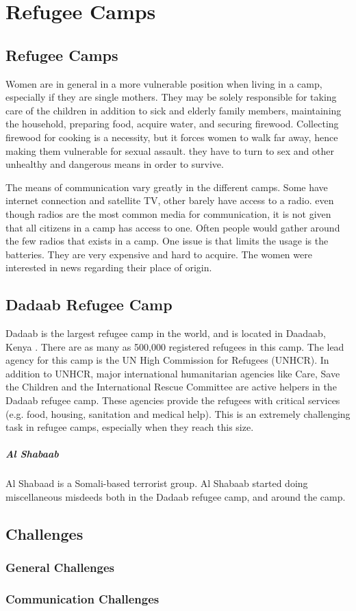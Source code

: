 \chapter{Refugee Camps}
\label{chp:refugeecamps} 

\section{Refugee Camps}

Women are in general in a more vulnerable position when living in a  camp, especially if they are single mothers. They may be solely responsible for taking care of the children in addition to sick and elderly family members, maintaining the household, preparing food, acquire water, and securing firewood. Collecting firewood for cooking is a necessity, but it forces women  to walk far away, hence making them vulnerable for sexual assault. they have to turn to sex and other unhealthy and dangerous means in order to survive. \cite{womenRefugee} 


The means of communication vary greatly in the different camps. Some have internet connection and satellite TV, other barely have access to a radio. even though radios are the most common media for communication, it is not given that all citizens in a camp has access to one. Often people would gather around the few radios that exists in a camp. One issue is that limits the usage is the batteries. They are very expensive and hard to acquire. The women were interested in news regarding their place of origin.   \cite{womenRefugee}  



\section{Dadaab Refugee Camp}
Dadaab is the largest refugee camp in the world, and is located in Daadaab, Kenya \cite{dadaab}. There are as many as 500,000 registered refugees in this camp. The lead agency for this camp is the UN High Commission for Refugees (UNHCR). In addition to UNHCR, major international humanitarian agencies like Care, Save the Children and the International Rescue Committee  are active helpers in the Dadaab refugee camp. These agencies provide the refugees with critical services (e.g. food, housing, sanitation and medical help). This is an extremely challenging task in refugee camps, especially when they reach this size. 

\paragraph{Al Shabaab}
Al Shabaad is a Somali-based terrorist group. Al Shabaab started doing miscellaneous misdeeds both in the Dadaab refugee camp, and around the camp.  


\section{Challenges}

\subsection{General Challenges}

\subsection{Communication Challenges}

